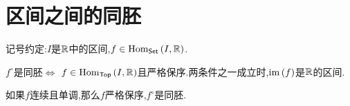 \section{区间之间的同胚}

记号约定:$I$是$\mathbb{R}$中的区间,$f\in\operatorname{Hom}_{\mathsf{Set}}\left(I,\mathbb{R}\right)$.

\begin{theorem}{}{}
	$f^{\circ}$是同胚$\iff$ $f\in\operatorname{Hom}_{\mathsf{Top}}\left(I,\mathbb{R}\right)$且严格保序.两条件之一成立时,$\operatorname{im}\left(f\right)$是$\mathbb{R}$的区间.
\end{theorem}

\begin{proposition}{}{}
	如果$f$连续且单调,那么$f$严格保序,$f^{\circ}$是同胚.
\end{proposition}